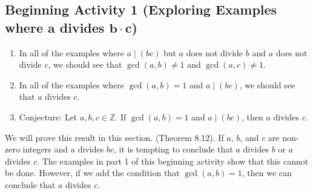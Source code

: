 \documentclass[11pt]{article}
\begin{document}
\noindent
\subsection*{Beginning Activity 1 (Exploring Examples where 
$\boldsymbol{a}$ divides $\boldsymbol{b \cdot c}$)}
\begin{enumerate}
\item In all of the examples where  $a \mid \left( {bc} \right)$ but  $a$  does not divide  $b$  and  $a$  does not divide  $c$, we should see that  $\gcd \left( {a, b} \right) \ne 1$  and   $\gcd \left( {a, c} \right) \ne 1$.

\item In all of the examples where $\gcd \left( {a, b} \right) = 1$  and  
$a \mid \left( {bc} \right)$, we should see that  $a$  divides  $c$.

\item Conjecture:  Let  $a, b, c \in \mathbb{Z}$.  If  $\gcd \left( {a, b} \right) = 1$
  and  $a \mid \left( {bc} \right)$, then  $a$  divides  $c$.
\end{enumerate}
We will prove this result in this section.  (Theorem 8.12).  If $a$, $b$, and $c$ are non-zero integers and $a$ divides $bc$, it is tempting to conclude that $a$ divides $b$ or $a$ divides $c$.  The examples in part 1 of this beginning activity show that this cannot be done.  However, if we add the condition that $\gcd(a, b) = 1$, then we can conclude that $a$ divides $c$.
\hbreak


\noindent
\end{document}
